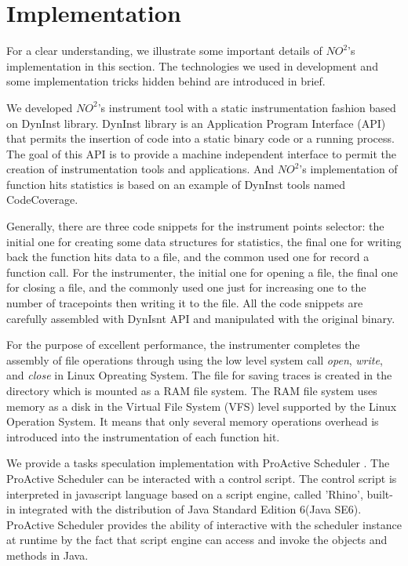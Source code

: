 \section{Implementation}

For a clear understanding, we illustrate some important details of $NO^2$'s implementation
in this section. The technologies we used in development and some implementation tricks
hidden behind are introduced in brief.

We developed $NO^2$'s instrument tool with a static instrumentation fashion based on
DynInst \cite{Dyninst-Deconstruction} library. DynInst library is an Application Program
Interface (API) \cite{dyninstapi} that permits the insertion of code into a static binary
code or a running process. The goal of this API is to provide a machine independent
interface to permit the creation of instrumentation tools and applications. And $NO^2$'s
implementation of function hits statistics is based on an example of DynInst tools named
CodeCoverage.

Generally, there are three code snippets for the instrument points selector: the initial
one for creating some data structures for statistics, the final one for writing back the
function hits data to a file, and the common used one for record a function call. For the
instrumenter, the initial one for opening a file, the final one for closing a file, and
the commonly used one just for increasing one to the number of tracepoints then writing it
to the file. All the code snippets are carefully assembled with DynIsnt API and
manipulated with the original binary.

For the purpose of excellent performance, the instrumenter completes the assembly of file
operations through using the low level system call \emph{open}, \emph{write}, and \emph{close} in
Linux Opreating System. The file for saving traces is created in the directory which is
mounted as a RAM file system. The RAM file system uses memory as a disk in the Virtual
File System (VFS) level supported by the Linux Operation System. It means that only
several memory operations overhead is introduced into the instrumentation of each function
hit.

We provide a tasks speculation implementation with ProActive Scheduler
\cite{pascheduling}. The ProActive Scheduler can be interacted with a control script. The
control script is interpreted in javascript language based on a script engine, called
'Rhino', built-in integrated with the distribution of Java Standard Edition 6(Java SE6).
ProActive Scheduler provides the ability of interactive with the scheduler instance at
runtime by the fact that script engine can access and invoke the objects and methods in
Java.

